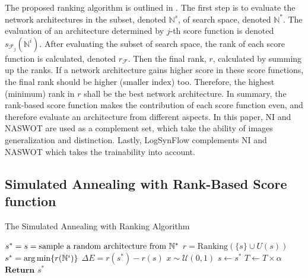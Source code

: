 \documentclass[sigconf]{acmart}
\begin{document}
    The proposed ranking algorithm is outlined in . 
    The first step is to evaluate the network architectures in the subset, 
    denoted $\mathbb N^s$, of search space, denoted $\mathbb N^*$. The 
    evaluation of an architecture determined by $j$-th score function is 
    denoted $s_{\mathcal F_j}(\mathbb N^i)$. After evaluating the subset 
    of search space, the rank of each score function is calculated, denoted 
    $r_{\mathcal F}$. Then the final rank, $r$, calculated by summing up 
    the ranks. If a network architecture gains higher score in these score 
    functions, the final rank should be higher (smaller index) too. Therefore, 
    the highest (minimum) rank in $r$ shall be the best network architecture. 
    In summary, the rank-based score function makes the contribution of 
    each score function even, and therefore evaluate an architecture from 
    different aspects. In this paper, NI and NASWOT are used as a complement 
    set, which take the ability of images generalization and distinction. 
    Lastly, LogSynFlow complements NI and NASWOT which takes the trainability 
    into account. 

    \subsection{Simulated Annealing with Rank-Based Score function}

    \begin{algorithm}[h]
        \caption{The Simulated Annealing with Ranking Algorithm}\label{alg:SA}
        \begin{algorithmic}[1]
            \State $s^*=s=\text{sample a random architecture from }\Bbb N^*$
                    \State $r=\text{Ranking}(\{s\}\cup U(s))$ 
                    \State $s^*=\arg\min\{r(\Bbb N^i)\}$ 
                    \State $\Delta E=r(s^*)-r(s)$
                    \State $x\sim \mathcal U(0,1)$ 
                     
                        \State $s\leftarrow s^*$
                    \EndIf
                \EndFor
                \State $T\leftarrow T\times \alpha$
            \EndWhile
            \State $\textbf{Return }s^*$ 
        \end{algorithmic}
    \end{algorithm}
\end{document}
